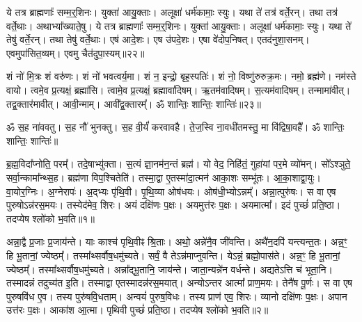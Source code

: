 ये तत्र ब्राह्मणाः᳚ सम्म॒र्॒\mbox{}शिनः। 
युक्ता॑ आयु॒क्ताः। 
अलूक्षा॑ धर्म॑कामाः॒ स्युः। 
यथा ते॑ तत्र॑ वर्ते॒रन्। 
तथा तत्र॑ वर्ते॒थाः। 
अथाभ्या᳚ख्याते॒षु। 
ये तत्र ब्राह्मणाः᳚ सम्म॒र्॒\mbox{}शिनः। 
युक्ता॑ आयु॒क्ताः। 
अलूक्षा॑ धर्म॑कामाः॒ स्युः। 
यथा ते॑ तेषु॑ वर्ते॒रन्। 
तथा तेषु॑ वर्ते॒थाः। 
एष॑ आदे॒शः। 
एष उ॑पदे॒शः। 
एषा वे॑दोप॒निषत्। 
एतद॑नुशा॒सनम्। 
एवमुपा॑सित॒व्यम्। 
एवमु चैत॑दुपा॒स्यम्॥२२॥
\anuvakamend[स्वाध्यायप्रवचनाभ्यान्न प्रम॑दित॒व्यं तानि त्वयो॑पास्या॒नि स्यात्तेषु॑ वर्ते॒रन्थ्स॒प्त च॑]

शं नो॑ मि॒त्रः शं वरु॑णः। 
शं नो॑ भवत्वर्य॒मा। 
शं न॒ इन्द्रो॒ बृह॒स्पतिः॑। 
शं नो॒ विष्णु॑रुरुक्र॒मः। 
नमो॒ ब्रह्म॑णे। 
नम॑स्ते वायो। 
त्वमे॒व प्र॒त्यक्षं॒ ब्रह्मा॑सि। 
त्वामे॒व प्र॒त्यक्षं॒ ब्रह्मावा॑दिषम्। 
ऋ॒तम॑वादिषम्। 
स॒त्यम॑वादिषम्। 
तन्मामा॑वीत्। 
तद्व॒क्तार॑मावीत्। 
आवी॒न्माम्। 
आवी᳚द्व॒क्तारम्᳚। 
ॐ शान्तिः॒ शान्तिः॒ शान्तिः॑॥२३॥
\anuvakamend[स॒त्यम॑वादिषं॒ पञ्च॑ च]


\setcounter{anuvakam}{0}
ॐ स॒ह ना॑ववतु। 
स॒ह नौ॑ भुनक्तु। 
स॒ह वी॒र्यं॑ करवावहै। 
ते॒ज॒स्वि ना॒वधी॑तमस्तु॒ मा वि॑द्विषा॒वहै᳚। 
ॐ शान्तिः॒ शान्तिः॒ शान्तिः॑॥%


ब्र॒ह्म॒विदा᳚प्नोति॒ परम्᳚। 
तदे॒षाभ्यु॑क्ता। 
स॒त्यं ज्ञा॒नम॑\-न॒न्तं ब्रह्म॑। 
यो वेद॒ निहि॑तं॒ गुहा॑यां पर॒मे व्यो॑मन्। 
सो᳚ऽश्ञुते॒ सर्वा॒न्कामा᳚न्थ्स॒ह। 
ब्रह्म॑णा वि\-प॒श्चितेति॑। 
तस्मा॒द्वा ए॒तस्मा॑\-दा॒त्मन॑ आका॒शः सम्भू॑तः। 
आ॒का॒शाद्वा॒युः। 
वा॒योर॒ग्निः। 
अ॒ग्नेरापः॑। 
अ॒द्भ्यः पृ॑थि॒वी। 
पृ॒थि॒व्या ओष॑धयः। 
ओष॑धी॒भ्यो\-ऽ\-न्नम्᳚। 
अन्ना॒त्पुरु॑षः। 
स वा एष पुरुषो\-ऽन्न॑\-रस॒मयः। 
तस्येद॑\-मेव॒ शिरः। 
अयं दक्षि॑णः प॒क्षः। 
अयमुत्त॑रः प॒क्षः। 
अयमात्मा᳚। 
इदं पुच्छं॑ प्रति\-॒ष्ठा। 
तदप्येष श्लो॑को भ॒वति॥१॥

अन्ना॒द्वै प्र॒जाः प्र॒जाय॑न्ते। 
याः काश्च॑ पृथि॒वीꣴ श्रि॒ताः। 
अथो॒ अन्ने॑नै॒व जी॑वन्ति। 
अथै॑न॒दपि॑ यन्त्यन्त॒तः। 
अन्न॒ꣳ॒ हि भू॒तानां॒ ज्येष्ठम्᳚। 
तस्मा᳚थ्सर्वौष॒धमु॑च्यते। 
सर्वं॒ वै तेऽन्न॑माप्नुवन्ति। 
येऽन्नं॒ ब्रह्मो॒पास॑ते। 
अन्न॒ꣳ॒ हि भू॒तानां॒ ज्येष्ठम्᳚। 
तस्मा᳚थ्सर्वौष॒धमु॑च्यते। 
अन्ना᳚द्भू॒तानि॒ जाय॑न्ते। 
जाता॒न्यन्ने॑न वर्धन्ते। 
अद्यतेऽत्ति च॑ भूता॒नि। 
तस्मादन्नं तदुच्य॑त इ॒ति। 
तस्माद्वा एतस्मादन्न॑रस॒मयात्। 
अन्योऽन्तर आत्मा᳚ प्राण॒मयः। 
तेनै॑ष पू॒र्णः। 
स वा एष पुरुषवि॑ध ए॒व। 
तस्य पुरु॑षवि॒धताम्। 
अन्वयं॑ पुरुष॒विधः। 
तस्य प्राण॑ एव॒ शिरः। 
व्यानो दक्षि॑णः प॒क्षः। 
अपान उत्त॑रः प॒क्षः। 
आका॑श आ॒त्मा। 
पृथिवी पुच्छं॑ प्रति\-॒ष्ठा। 
तदप्येष श्लो॑को भ॒वति॥२॥

